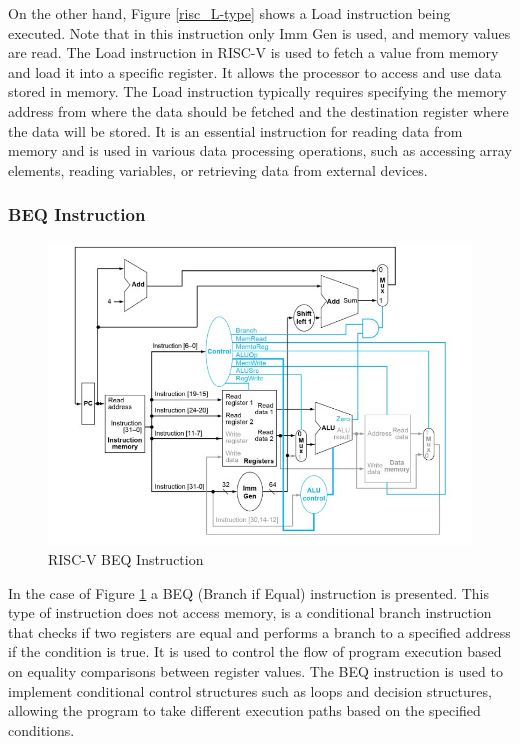                 On the other hand, Figure \ref{risc_L-type} shows a Load instruction being executed. Note that in this instruction only Imm Gen is used, and memory values are read. The Load instruction in RISC-V is used to fetch a value from memory and load it into a specific register. It allows the processor to access and use data stored in memory. The Load instruction typically requires specifying the memory address from where the data should be fetched and the destination register where the data will be stored. It is an essential instruction for reading data from memory and is used in various data processing operations, such as accessing array elements, reading variables, or retrieving data from external devices.
            
            \subsubsection{BEQ Instruction}

                \begin{figure}[!h]
                \centering
                \includegraphics[width= 0.8
                \textwidth]{figures/riscv/risc_BEQ-type.jpg}
                    \caption{\label{risc_BEQ-type} RISC-V BEQ Instruction}
                \end{figure}

                In the case of Figure \ref{risc_BEQ-type} a BEQ (Branch if Equal) instruction is presented. This type of instruction does not access memory, is a conditional branch instruction that checks if two registers are equal and performs a branch to a specified address if the condition is true. It is used to control the flow of program execution based on equality comparisons between register values. The BEQ instruction is used to implement conditional control structures such as loops and decision structures, allowing the program to take different execution paths based on the specified conditions.                

